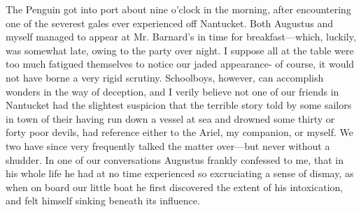 The Penguin got into port about nine o'clock in the morning, after
encountering one of the severest gales ever experienced off Nantucket. Both
Augustus and myself managed to appear at Mr. Barnard's in time for
breakfast---which, luckily, was somewhat late, owing to the party over night. I
suppose all at the table were too much fatigued themselves to notice our jaded
appearance- of course, it would not have borne a very rigid scrutiny.
Schoolboys, however, can accomplish wonders in the way of deception, and I
verily believe not one of our friends in Nantucket had the slightest suspicion
that the terrible story told by some sailors in town of their having run down a
vessel at sea and drowned some thirty or forty poor devils, had reference either
to the Ariel, my companion, or myself. We two have since very frequently talked
the matter over---but never without a shudder. In one of our conversations
Augustus frankly confessed to me, that in his whole life he had at no time
experienced so excruciating a sense of dismay, as when on board our little boat
he first discovered the extent of his intoxication, and felt himself sinking
beneath its influence. 


